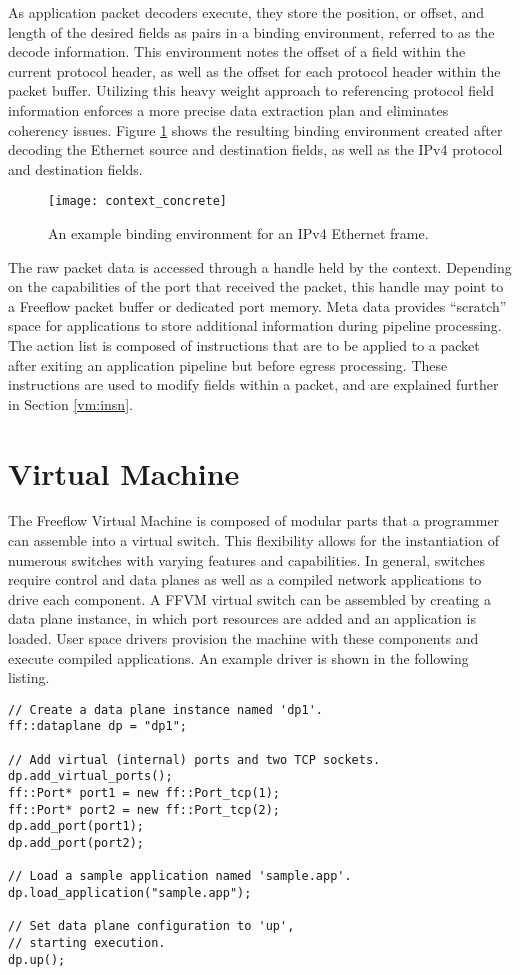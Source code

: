 As application packet decoders execute, they store the position, or offset, and
length of the desired fields as pairs in a binding environment, referred to as
the decode information. This environment notes the offset of a field within the
current protocol header, as well as the offset for each protocol header within
the packet buffer. Utilizing this heavy weight approach to referencing protocol
field information enforces a more precise data extraction plan and eliminates
coherency issues. Figure \ref{context_binding} shows the resulting binding
environment created after decoding the Ethernet source and destination fields,
as well as the IPv4 protocol and destination fields.

\begin{figure}[h!]
\centering
\texttt{[image: context\_concrete]}
\caption{An example binding environment for an IPv4 Ethernet frame.}
\label{context_binding}
\end{figure}

The raw packet data is accessed through a handle held by the context. Depending
on the capabilities of the port that received the packet, this handle may point
to a Freeflow packet buffer or dedicated port memory. Meta data provides
``scratch'' space for applications to store additional information during
pipeline processing. The action list is composed of instructions that are to
be applied to a packet after exiting an application pipeline but before egress
processing. These instructions are used to modify fields within a packet, and
are explained further in Section \ref{vm:insn}.

\section{Virtual Machine}
\label{vm}
The Freeflow Virtual Machine is composed of modular parts that a programmer can
assemble into a virtual switch. This flexibility allows for the instantiation
of numerous switches with varying features and capabilities. In general,
switches require control and data planes as well as a compiled network
applications to drive each component. A FFVM virtual switch can be assembled
by creating a data plane instance, in which port resources are added and an
application is loaded. User space drivers provision the machine with these
components and execute compiled applications. An example driver is shown in the
following listing.

\begin{lstlisting}
// Create a data plane instance named 'dp1'.
ff::dataplane dp = "dp1";

// Add virtual (internal) ports and two TCP sockets.
dp.add_virtual_ports();
ff::Port* port1 = new ff::Port_tcp(1);
ff::Port* port2 = new ff::Port_tcp(2);
dp.add_port(port1);
dp.add_port(port2);

// Load a sample application named 'sample.app'.
dp.load_application("sample.app");

// Set data plane configuration to 'up', 
// starting execution.
dp.up();
\end{lstlisting}

